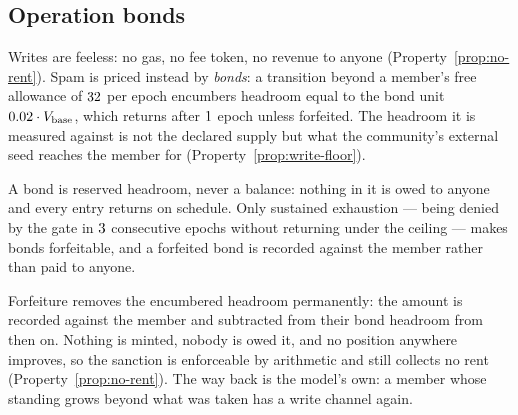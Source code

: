 \subsection{Operation bonds}

Writes are feeless: no gas, no fee token, no revenue to anyone
(Property~\ref{prop:no-rent}). Spam is priced instead by \emph{bonds}: a transition beyond
a member's free allowance of $32$ per epoch encumbers headroom equal
to the bond unit $0.02 \cdot V_{\mathrm{base}}$, which returns after
$1$ epoch unless forfeited. The headroom it is measured against is
not the declared supply but what the community's external seed reaches the member for
(Property~\ref{prop:write-floor}).

A bond is reserved headroom, never a balance: nothing in it is owed to anyone and every
entry returns on schedule. Only sustained exhaustion --- being denied by the gate in
$3$ consecutive epochs without returning under the ceiling --- makes
bonds forfeitable, and a forfeited bond is recorded against the member rather than paid to
anyone.

\begin{property}
\label{prop:forfeit}
Forfeiture removes the encumbered headroom permanently: the amount is recorded against the
member and subtracted from their bond headroom from then on. Nothing is minted, nobody is
owed it, and no position anywhere improves, so the sanction is enforceable by arithmetic
and still collects no rent (Property~\ref{prop:no-rent}). The way back is the model's own:
a member whose standing grows beyond what was taken has a write channel again.
\end{property}

